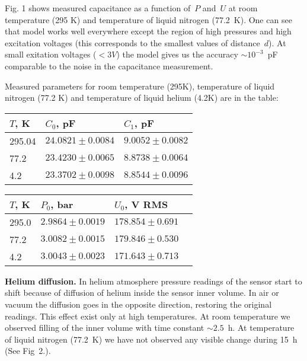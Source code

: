 \documentclass[a4paper]{article}
\begin{document}
Fig. 1 shows measured capacitance as a function of~$P$ and~$U$ at room
temperature (295 K) and temperature of liquid nitrogen (77.2~K). One can
see that model works well everywhere except the region of high pressures
and high excitation voltages (this corresponds to the smallest values of
distance~$d$). At small exitation voltages ($<3V$) the model gives us the
accuracy $\sim 10^{-3}$~pF comparable to the noise in the capacitance measurement.

Measured parameters for room temperature (295K), temperature of liquid
nitrogen (77.2 K) and temperature of liquid helium (4.2K) are in the
table:

\begin{tabular}{lll}
$T$, K & $C_0$, pF          & $C_1$, pF \\\hline
295.04 & $24.0821\pm0.0084$ & $9.0052\pm0.0082$\\
77.2   & $23.4230\pm0.0065$ & $8.8738\pm0.0064$\\
4.2    & $23.3702\pm0.0098$ & $8.8544\pm0.0096$\\
\hline
\end{tabular}

\begin{tabular}{llll}
$T$, K & $P_0$, bar & $U_0$, V RMS\\\hline
295.0 & $2.9864\pm0.0019$ & $178.854\pm0.691$\\
77.2  & $3.0082\pm0.0015$ & $179.846\pm0.530$\\
4.2   & $3.0043\pm0.0023$ & $171.643\pm0.713$\\
\hline
\end{tabular}
\medskip

%


{\bf Helium diffusion.} In helium atmosphere pressure readings of the
sensor start to shift because of diffusion of helium inside the sensor
inner volume. In air or vacuum the diffusion goes in the opposite
direction, restoring the original readings. This effect exist only at
high temperatures. At room temperature we observed filling of the inner
volume with time constant $\sim2.5$~h. At temperature of liquid nitrogen
(77.2~K) we have not observed any visible change during 15~h
(See Fig~2.).

\end{document}

